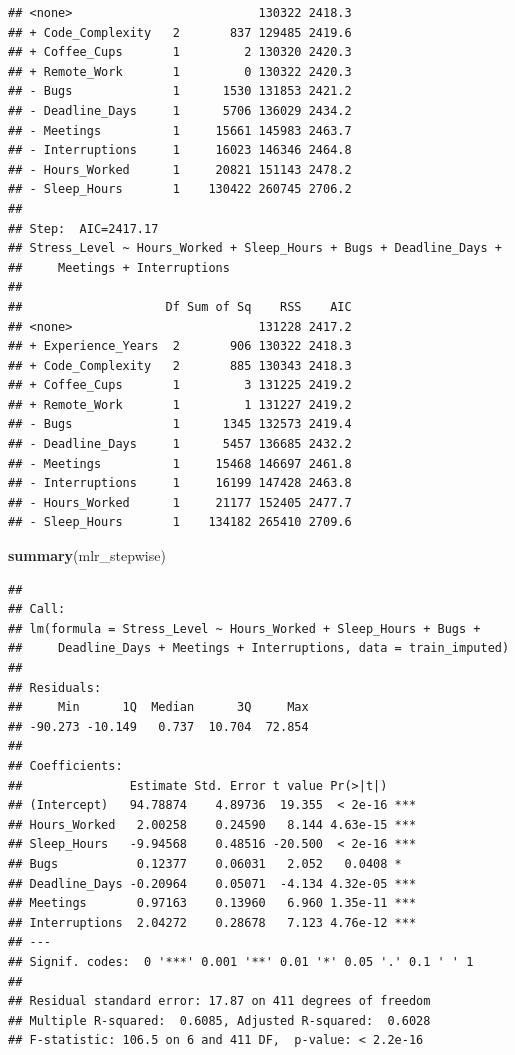 \documentclass[
]{article}
\newenvironment{Shaded}{\begin{snugshade}}{\end{snugshade}}
\newcommand{\FunctionTok}[1]{\textcolor[rgb]{0.13,0.29,0.53}{\textbf{#1}}}
\newcommand{\NormalTok}[1]{#1}
\begin{document}
\begin{verbatim}
## <none>                          130322 2418.3
## + Code_Complexity   2       837 129485 2419.6
## + Coffee_Cups       1         2 130320 2420.3
## + Remote_Work       1         0 130322 2420.3
## - Bugs              1      1530 131853 2421.2
## - Deadline_Days     1      5706 136029 2434.2
## - Meetings          1     15661 145983 2463.7
## - Interruptions     1     16023 146346 2464.8
## - Hours_Worked      1     20821 151143 2478.2
## - Sleep_Hours       1    130422 260745 2706.2
## 
## Step:  AIC=2417.17
## Stress_Level ~ Hours_Worked + Sleep_Hours + Bugs + Deadline_Days + 
##     Meetings + Interruptions
## 
##                    Df Sum of Sq    RSS    AIC
## <none>                          131228 2417.2
## + Experience_Years  2       906 130322 2418.3
## + Code_Complexity   2       885 130343 2418.3
## + Coffee_Cups       1         3 131225 2419.2
## + Remote_Work       1         1 131227 2419.2
## - Bugs              1      1345 132573 2419.4
## - Deadline_Days     1      5457 136685 2432.2
## - Meetings          1     15468 146697 2461.8
## - Interruptions     1     16199 147428 2463.8
## - Hours_Worked      1     21177 152405 2477.7
## - Sleep_Hours       1    134182 265410 2709.6
\end{verbatim}

\begin{Shaded}
\begin{Highlighting}[]
\FunctionTok{summary}\NormalTok{(mlr\_stepwise)}
\end{Highlighting}
\end{Shaded}

\begin{verbatim}
## 
## Call:
## lm(formula = Stress_Level ~ Hours_Worked + Sleep_Hours + Bugs + 
##     Deadline_Days + Meetings + Interruptions, data = train_imputed)
## 
## Residuals:
##     Min      1Q  Median      3Q     Max 
## -90.273 -10.149   0.737  10.704  72.854 
## 
## Coefficients:
##               Estimate Std. Error t value Pr(>|t|)    
## (Intercept)   94.78874    4.89736  19.355  < 2e-16 ***
## Hours_Worked   2.00258    0.24590   8.144 4.63e-15 ***
## Sleep_Hours   -9.94568    0.48516 -20.500  < 2e-16 ***
## Bugs           0.12377    0.06031   2.052   0.0408 *  
## Deadline_Days -0.20964    0.05071  -4.134 4.32e-05 ***
## Meetings       0.97163    0.13960   6.960 1.35e-11 ***
## Interruptions  2.04272    0.28678   7.123 4.76e-12 ***
## ---
## Signif. codes:  0 '***' 0.001 '**' 0.01 '*' 0.05 '.' 0.1 ' ' 1
## 
## Residual standard error: 17.87 on 411 degrees of freedom
## Multiple R-squared:  0.6085, Adjusted R-squared:  0.6028 
## F-statistic: 106.5 on 6 and 411 DF,  p-value: < 2.2e-16
\end{verbatim}
\end{document}
